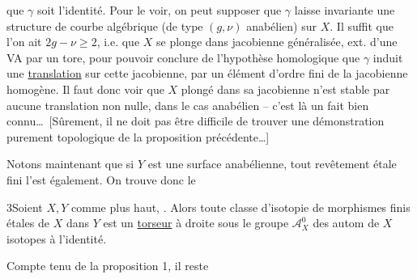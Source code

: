 que $\gamma$ soit l'identité. Pour le voir, on peut supposer que $\gamma$ laisse invariante une structure  de courbe algébrique (de type $(g,\nu)$ anabélien) sur $X$. Il suffit  que l'on ait $2g-\nu\geq2$, i.e. que $X$ se plonge dans  jacobienne généralisée, ext. d'une VA par un tore, pour pouvoir conclure de l'hypothèse homologique que $\gamma$  induit une \uline{translation} sur cette jacobienne, par un élément d'ordre fini de la jacobienne homogène. Il faut donc voir que $X$ plongé dans sa jacobienne n'est stable par aucune  translation non nulle, dans le cas anabélien -- c'est là un fait bien connu\ldots\ [Sûrement, il ne doit pas être difficile de trouver une démonstration purement topologique de la proposition précédente\ldots]

Notons maintenant que si $Y$ est une surface  anabélienne, tout revêtement étale fini l'est également. On trouve donc le

  3\quad Soient $X,Y$  comme plus haut, .
Alors toute classe d'isotopie de morphismes finis étales de $X$ dans $Y$ est un \uline{torseur} à droite sous le groupe $\mathcal{A}_X^0$ des autom de $X$ isotopes à l'identité.

Compte tenu de la proposition 1, il reste
